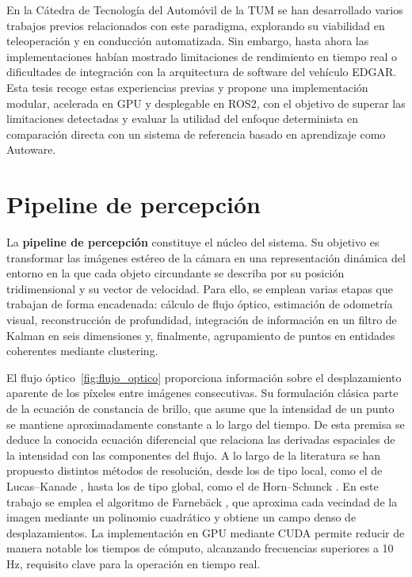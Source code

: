 En la Cátedra de Tecnología del Automóvil de la TUM se han desarrollado varios
trabajos previos relacionados con este paradigma, explorando su viabilidad en
teleoperación y en conducción automatizada. Sin embargo, hasta ahora las
implementaciones habían mostrado limitaciones de rendimiento en tiempo real o
dificultades de integración con la arquitectura de software del vehículo
EDGAR. Esta tesis recoge estas experiencias previas y propone una
implementación modular, acelerada en GPU y desplegable en ROS2, con el objetivo
de superar las limitaciones detectadas y evaluar la utilidad del enfoque
determinista en comparación directa con un sistema de referencia basado en
aprendizaje como Autoware.


\section{Pipeline de percepción}
\label{sec:pipeline_percepcion}

La \textbf{pipeline de percepción} constituye el núcleo del sistema. Su
objetivo es transformar las imágenes estéreo de la cámara en una representación
dinámica del entorno en la que cada objeto circundante se describa por su
posición tridimensional y su vector de velocidad. Para ello, se emplean varias
etapas que trabajan de forma encadenada: cálculo de flujo óptico, estimación de
odometría visual, reconstrucción de profundidad, integración de información en
un filtro de Kalman en seis dimensiones y, finalmente, agrupamiento de puntos
en entidades coherentes mediante clustering.

El flujo óptico~\ref{fig:flujo_optico} proporciona información sobre el desplazamiento aparente de los
píxeles entre imágenes consecutivas. Su formulación clásica parte de la
ecuación de constancia de brillo, que asume que la intensidad de un punto se
mantiene aproximadamente constante a lo largo del tiempo. De esta premisa se
deduce la conocida ecuación diferencial que relaciona las derivadas espaciales
de la intensidad con las componentes del flujo. A lo largo de la literatura se
han propuesto distintos métodos de resolución, desde los de tipo local, como el
de Lucas–Kanade \cite{opt_flw_lukas_canade}, hasta los de tipo global, como el
de Horn–Schunck \cite{opt_flw_schunck}. En este trabajo se emplea el algoritmo
de Farnebäck \cite{opf_flw_farneback}, que aproxima cada vecindad de la imagen
mediante un polinomio cuadrático y obtiene un campo denso de desplazamientos.
La implementación en GPU mediante CUDA permite reducir de manera notable los
tiempos de cómputo, alcanzando frecuencias superiores a 10 Hz, requisito clave
para la operación en tiempo real.


